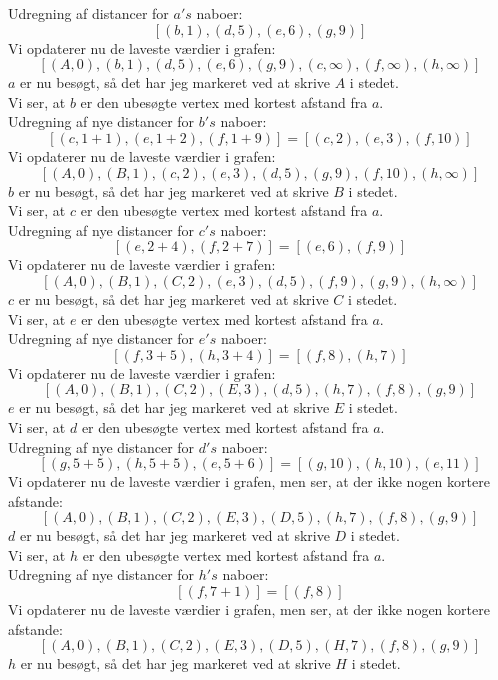 \documentclass[a4paper,12pt]{article}
\begin{document}
Udregning af distancer for $a's$ naboer:
\[
[(b,1),(d,5),(e,6),(g,9)]
\]
Vi opdaterer nu de laveste værdier i grafen:
\[
[(A,0),(b,1),(d,5),(e,6),(g,9),(c,\infty),(f,\infty),(h,\infty)]
\]
$a$ er nu besøgt, så det har jeg markeret ved at skrive $A$ i stedet.\\

Vi ser, at $b$ er den ubesøgte vertex med kortest afstand fra $a.$\\
Udregning af nye distancer for $b's$ naboer:
\[
[(c,1+1),(e,1+2),(f,1+9)] = [(c,2),(e,3),(f,10)]
\]
Vi opdaterer nu de laveste værdier i grafen:
\[
[(A,0),(B,1),(c,2),(e,3),(d,5),(g,9),(f,10),(h,\infty)]
\]
$b$ er nu besøgt, så det har jeg markeret ved at skrive $B$ i stedet.\\

Vi ser, at $c$ er den ubesøgte vertex med kortest afstand fra $a$.\\
Udregning af nye distancer for $c's$ naboer:
\[
[(e,2+4),(f,2+7)] = [(e,6),(f,9)]
\]
Vi opdaterer nu de laveste værdier i grafen:
\[
[(A,0),(B,1),(C,2),(e,3),(d,5),(f,9),(g,9),(h,\infty)]
\]
$c$ er nu besøgt, så det har jeg markeret ved at skrive $C$ i stedet.\\

Vi ser, at $e$ er den ubesøgte vertex med kortest afstand fra $a$.\\
Udregning af nye distancer for $e's$ naboer:
\[
[(f,3+5),(h,3+4)] = [(f,8),(h,7)]
\]
Vi opdaterer nu de laveste værdier i grafen:
\[
[(A,0),(B,1),(C,2),(E,3),(d,5),(h,7),(f,8),(g,9)]
\]
$e$ er nu besøgt, så det har jeg markeret ved at skrive $E$ i stedet.\\

Vi ser, at $d$ er den ubesøgte vertex med kortest afstand fra $a$.\\
Udregning af nye distancer for $d's$ naboer:
\[
[(g,5+5),(h,5+5),(e,5+6)] = [(g,10),(h,10),(e,11)]
\]
Vi opdaterer nu de laveste værdier i grafen, men ser, at der ikke nogen kortere afstande:
\[
[(A,0),(B,1),(C,2),(E,3),(D,5),(h,7),(f,8),(g,9)]
\]
$d$ er nu besøgt, så det har jeg markeret ved at skrive $D$ i stedet.\\

Vi ser, at $h$ er den ubesøgte vertex med kortest afstand fra $a$.\\
Udregning af nye distancer for $h's$ naboer:
\[
[(f,7+1)] = [(f,8)]
\]
Vi opdaterer nu de laveste værdier i grafen, men ser, at der ikke nogen kortere afstande:
\[
[(A,0),(B,1),(C,2),(E,3),(D,5),(H,7),(f,8),(g,9)]
\]
$h$ er nu besøgt, så det har jeg markeret ved at skrive $H$ i stedet.\\
\end{document}
